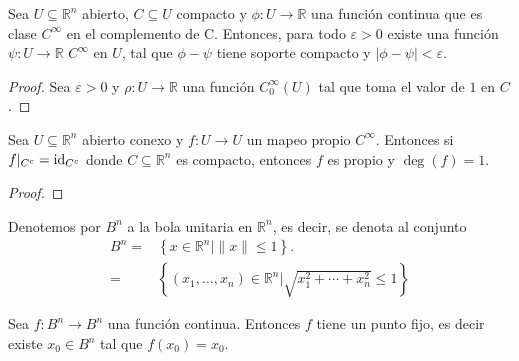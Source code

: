 \documentclass[12pt]{report}
\theoremstyle{largebreak}
\newcommand\abs[1]{\ensuremath{\lvert#1\rvert}}
\newcommand\cf[3]{\ensuremath{#1:#2\rightarrow#3}}
\begin{document}
\begin{lema}
    Sea $U\subseteq\mathbb{R}^n$ abierto, $C\subseteq U$ compacto y $\cf{\phi}{U}{\mathbb{R}}$ una función continua que es clase $C^{\infty}$ en el complemento de C. Entonces, para todo $\varepsilon > 0$ existe una función $\cf{\psi}{U}{\mathbb{R}}$ $C^{\infty}$ en $U$, tal que $\phi - \psi$ tiene soporte compacto y $\abs{\phi - \psi}<\varepsilon$.
\end{lema}

\begin{proof}
    Sea $\varepsilon>0$ y $\cf{\rho}{U}{\mathbb{R}}$ una función $C_0^{\infty}(U)$ tal que toma el valor de $1$ en $C$.
\end{proof}

\begin{propo}
    Sea $U\subseteq \mathbb{R}^n$ abierto conexo y $\cf{f}{U}{U}$ un mapeo propio $C^{\infty}$. Entonces si $f|_{C^c}=\textup{id}_{C^c}$ donde $C\subseteq\mathbb{R}^n$ es compacto, entonces $f$ es propio y $\deg(f)=1$.
\end{propo}

\begin{proof}
    
\end{proof}

Denotemos por $B^n$ a la bola unitaria en $\mathbb{R}^n$, es decir, se denota al conjunto
\begin{equation*}
    \begin{split}
        B^n=&\left\{x\in\mathbb{R}^n|\|x\|\leq 1\right\}.\\
        =&\left\{(x_1,\dots,x_n)\in\mathbb{R}^n|\sqrt{x_1^2+\cdots+x_n^2}\leq1\right\}
    \end{split}
\end{equation*}

\begin{theor}
    Sea $\cf{f}{B^n}{B^n}$ una función continua. Entonces $f$ tiene un punto fijo, es decir existe $x_0\in B^n$ tal que $f(x_0)=x_0$.
\end{theor}
\end{document}

